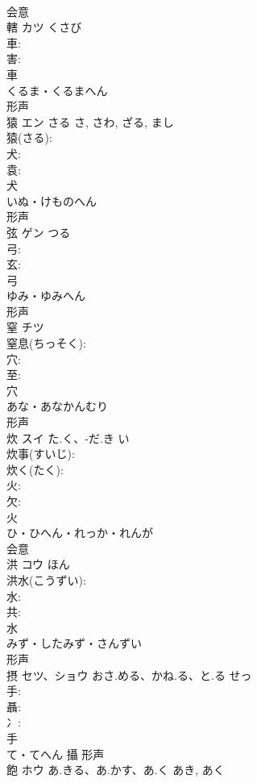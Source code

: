 \documentclass[8pt]{extreport}
\begin{document}
\begin{CJK}{UTF8}{min}
\\	会意 
\\	轄	カツ	くさび		
\\	車: 
\\	害: 
\\	車	
\\	くるま・くるまへん	
\\	形声 
\\	猿	エン	さる	さ, さわ, ざる, まし	
\\	猿(さる): 
\\	犬: 
\\	袁: 
\\	犬	
\\	いぬ・けものへん	
\\	形声 
\\	弦	ゲン	つる		
\\	弓: 
\\	玄: 
\\	弓	
\\	ゆみ・ゆみへん	
\\	形声 
\\	窒	チツ			
\\	窒息(ちっそく): 
\\	穴: 
\\	至: 
\\	穴	
\\	あな・あなかんむり	
\\	形声 
\\	炊	スイ	た.く、-だ.き	い	
\\	炊事(すいじ): 
\\	炊く(たく): 
\\	火: 
\\	欠: 
\\	火	
\\	ひ・ひへん・れっか・れんが	
\\	会意 
\\	洪	コウ		ほん	
\\	洪水(こうずい): 
\\	水: 
\\	共: 
\\	水	
\\	みず・したみず・さんずい	
\\	形声 
\\	摂	セツ、ショウ	おさ.める、かね.る、と.る	せっ	
\\	手: 
\\	聶: 
\\	冫: 
\\	手	
\\	て・てへん	攝	形声 
\\	飽	ホウ	あ.きる、あ.かす、あ.く	あき, あく	

\end{CJK}
\end{document}
